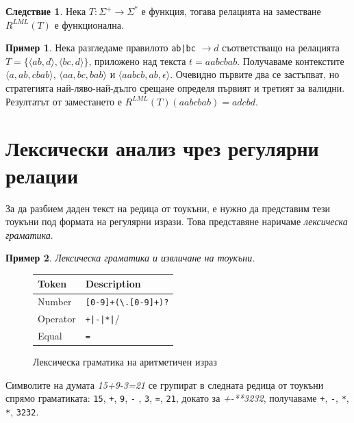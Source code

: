 \documentclass[12pt, oneside]{article}
\theoremstyle{definition}
\newtheorem{example}{Пример}[section]
\newtheorem{corollary}{Следствие}[section]
\begin{document}
\begin{corollary}
	Нека \( T: \Sigma^+ \to \Sigma^* \) е функция, тогава релацията на заместване \( R^{LML}(T) \) е функционална.
\end{corollary}

\begin{example}
	Нека разгледаме правилото \verb/ab|bc/ \( \to d \) съответстващо на релацията \(T = \{ \langle ab,d \rangle, \langle bc, d \rangle \} \), приложено над текста \( t = aabcbab \). Получаваме контекстите \( \langle a, ab, cbab \rangle \), \( \langle aa, bc, bab \rangle \) и \( \langle aabcb, ab, \epsilon \rangle \). Очевидно първите два се застъпват, но стратегията най-ляво-най-дълго срещане определя първият и третият за валидни. Резултатът от заместането е \( R^{LML}(T)(aabcbab) = adcbd \).
\end{example}

\section{Лексически анализ чрез регулярни релации}

 За да разбием даден текст на редица от тоукъни, е нужно да представим тези тоукъни под формата на регулярни изрази. Това представяне наричаме \emph{лексическа граматика}.

\begin{example}{\emph{Лексическа граматика и извличане на тоукъни.}}
	\label{ex:ar-gram}
	\begin{figure}[!htb]
		\begin{center}
			\begin{tabular}{ |l|l| }
			\hline
			\textbf{Token} & \textbf{Description} \\
			\hline
			Number & \verb/[0-9]+(\.[0-9]+)?/ \\
			Operator & \verb/+|-|*|// \\
			Equal & \verb/=/ \\
			\hline
			\end{tabular}
		\end{center}
		\caption{Лексическа граматика на аритметичен израз}
	\end{figure}
	
	\noindent Символите на думата \emph{15+9-3=21} се групират в следната редица от тоукъни спрямо граматиката: \texttt{15}, \texttt{+}, \texttt{9}, \texttt{-} , \texttt{3}, \texttt{=}, \texttt{21}, докато за \emph{+-**3232}, получаваме \texttt{+}, \texttt{-}, \texttt{*}, \texttt{*}, \texttt{3232}.
\end{example}
\end{document}
